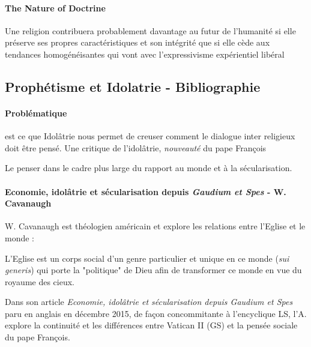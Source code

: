   


\paragraph{The Nature of Doctrine} \cite{lindbeck_nature_2002}
\begin{singlequote}
    Une religion contribuera probablement davantage au futur de l’humanité si elle préserve ses propres caractéristiques et son intégrité que si elle cède aux tendances homogénéisantes qui vont avec l’expressivisme expérientiel libéral \cite[ p. 115]{lindbeck_nature_2002}
\end{singlequote}

 


\subsection{Prophétisme et Idolatrie - Bibliographie}
\paragraph{Problématique}
est ce que Idolâtrie nous permet de creuser comment le dialogue inter religieux doit être pensé. 
Une critique de l'idolâtrie, \textit{nouveauté} du pape François

Le penser dans le cadre plus large du rapport au monde et à la sécularisation. 





\paragraph{Economie, idolâtrie et sécularisation depuis \textit{Gaudium et Spes} - W. Cavanaugh} 
W. Cavanaugh est théologien américain et explore les relations entre l'Eglise et le monde :
\begin{singlequote}
    L'Eglise est un corps social d'un genre particulier et unique en ce monde (\textit{sui generis}) qui porte la "politique" de Dieu afin de transformer ce monde  en vue du royaume des cieux.\cite[p. 10]{cavanaugh_idolatrie_2022}
\end{singlequote}
Dans son article \textit{Economie, idolâtrie et sécularisation depuis \textit{Gaudium et Spes}} paru en anglais en décembre 2015, de façon concommitante à l'encyclique LS, l'A. explore la continuité et les différences entre Vatican II (GS) et la pensée sociale du pape François. 

